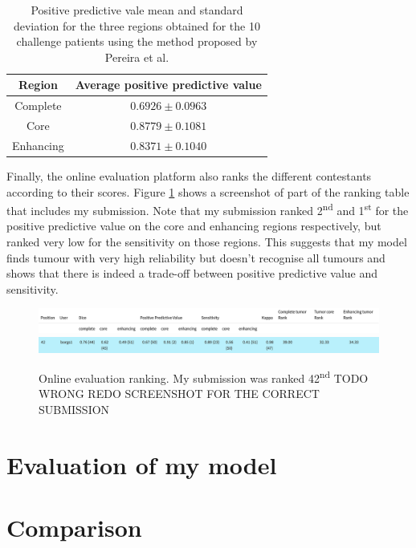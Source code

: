 \documentclass[12pt,a4paper,twoside,openright]{report}
\begin{document}
\begin{table}[h]
\centering	
\label{table:pereira_ppb_average}
\begin{tabular}{ c | c } 
\textbf{Region} & \textbf{Average positive predictive value} \\
\hline
Complete &	$0.6926 \pm 0.0963$ \\
Core & 		$0.8779 \pm 0.1081$ \\
Enhancing & $0.8371  \pm 0.1040$ \\
\end{tabular}
\caption{Positive predictive vale mean and standard deviation for the three regions obtained for the 10 challenge patients using the method proposed by Pereira et al.}
\end{table}

Finally, the online evaluation platform also ranks the different contestants according to their scores. Figure \ref{fig:online_eval_rank} shows a screenshot of part of the ranking table that includes my submission. Note that my submission ranked 2\textsuperscript{nd} and 1\textsuperscript{st} for the positive predictive value on the core and enhancing regions respectively, but ranked very low for the sensitivity on those regions. This suggests that my model finds tumour with very high reliability but doesn't recognise all tumours and shows that there is indeed a trade-off between positive predictive value and sensitivity.

\begin{figure}[h]
	\centering
	\label{fig:online_eval_rank}
	\includegraphics[width=\textwidth]{ranking_table_header}
	\includegraphics[width=\textwidth]{pereira_model_ranked_results}
	\caption{Online evaluation ranking. My submission was ranked 42\textsuperscript{nd} TODO WRONG REDO SCREENSHOT FOR THE CORRECT SUBMISSION}
\end{figure}
\section{Evaluation of my model}
\section{Comparison}
\end{document}

